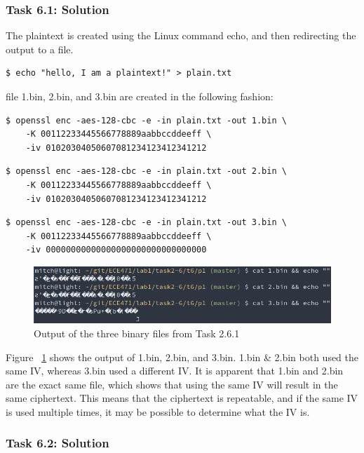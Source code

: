 \documentclass[12pt]{article}
\begin{document}
\subsubsection{Task 6.1: Solution}

The plaintext is created using the Linux command echo, and then redirecting the output to a file.

\begin{verbatim}
$ echo "hello, I am a plaintext!" > plain.txt
\end{verbatim}

file 1.bin, 2.bin, and 3.bin are created in the following fashion:
\begin{verbatim}
$ openssl enc -aes-128-cbc -e -in plain.txt -out 1.bin \
    -K 00112233445566778889aabbccddeeff \
    -iv 01020304050607081234123412341212
\end{verbatim}
\begin{verbatim}
$ openssl enc -aes-128-cbc -e -in plain.txt -out 2.bin \
    -K 00112233445566778889aabbccddeeff \
    -iv 01020304050607081234123412341212
\end{verbatim}
\begin{verbatim}
$ openssl enc -aes-128-cbc -e -in plain.txt -out 3.bin \
    -K 00112233445566778889aabbccddeeff \
    -iv 00000000000000000000000000000000
\end{verbatim}

\begin{figure}[H]
    \begin{center}
        \includegraphics[scale=0.55]{t6p0.png}
    \end{center}{}
    \caption{Output of the three binary files from Task 2.6.1}
    \label{fig:t6p0}
\end{figure}

Figure ~\ref{fig:t6p0} shows the output of 1.bin, 2.bin, and 3.bin. 1.bin & 2.bin both used the same IV, whereas 3.bin used a different IV. It is apparent that 1.bin and 2.bin are the exact same file, which shows that using the same IV will result in the same ciphertext. This means that the ciphertext is repeatable, and if the same IV is used multiple times, it may be possible to determine what the IV is.
\clearpage
\subsubsection{Task 6.2: Solution}
\end{document}
